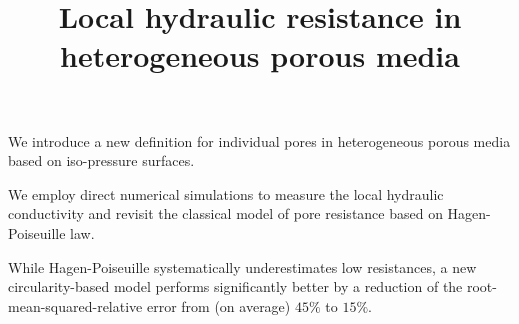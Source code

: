 \documentclass[draft]{agujournal2019}
\providecommand{\DIFaddbegin}{} %
\providecommand{\DIFaddend}{} %
\providecommand{\DIFdelbegin}{} %
\providecommand{\DIFdelend}{} %
\begin{document}
\title{Local hydraulic resistance in heterogeneous porous media}


\DIFdelbegin %
\DIFdelend \DIFaddbegin {}
\DIFaddend 









\begin{keypoints}
\item We introduce a new definition for individual pores in heterogeneous porous media based on iso-pressure surfaces.
\item We employ direct numerical simulations to measure the local hydraulic conductivity and revisit the classical model of pore resistance based on Hagen-Poiseuille law. 
\item While Hagen-Poiseuille systematically underestimates low resistances, a new circularity-based model performs significantly better by a reduction of the root-mean-squared-relative error from (on average) $45\%$ to $15\%$.
\end{keypoints}
\end{document}
